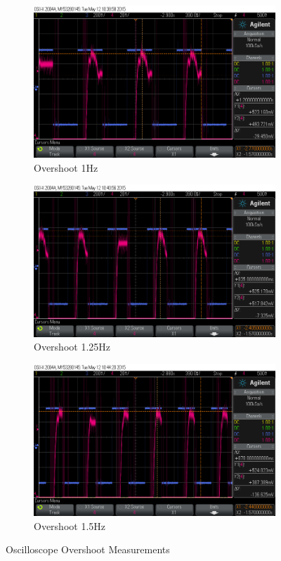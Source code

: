 \documentclass[11pt,a4paper]{article}
\begin{document}
\begin{enumerate}
\begin{figure}[H]
  \begin{subfigure}{0.5\textwidth}
  \includegraphics[width=0.95\linewidth]{Oscilloscope/PartD_1_0Hz_Overshoot.png}
  \caption{Overshoot 1Hz}
  \label{fig:subim2}
  \end{subfigure}
  \begin{subfigure}{0.5\textwidth}
  \includegraphics[width=0.95\linewidth]{Oscilloscope/PartD_1_25Hz_Overshoot.png}
  \caption{Overshoot 1.25Hz}
  \label{fig:subim2}
  \end{subfigure}

  \begin{subfigure}{0.5\textwidth}
  \includegraphics[width=0.95\linewidth]{Oscilloscope/PartD_1_50Hz_Overshoot.png}
  \caption{Overshoot 1.5Hz}
  \label{fig:subim2}
  \end{subfigure}
\caption{\label{fig:freqimpact}Oscilloscope Overshoot Measurements}
\end{figure}


\end{enumerate}
\end{document}

